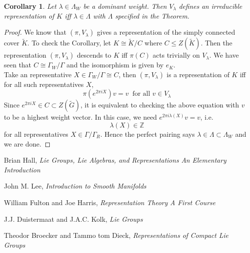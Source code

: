 \documentclass[11pt]{book}
\newtheorem{corollary}[theorem]{Corollary}
\newcommand{\bb}[1]{\mathbb{#1}}
\begin{document}
\begin{corollary}
Let $\lambda \in \Lambda_W$ be a dominant weight. Then $V_{\lambda}$ defines an irreducible representation of $K$ iff $\lambda \in \Lambda$ with $\Lambda$ specified in the Theorem.
\end{corollary}
\begin{proof}
We know that $(\pi,V_{\lambda})$ gives a representation of the simply connected cover $\tilde{K}$. To check the Corollary, let $K \cong \tilde{K}/C$ where $C \leq Z(\tilde{K})$. Then the representation $(\pi,V_{\lambda})$ descends to $K$ iff $\pi(C)$ acts trivially on $V_{\lambda}$. We have seen that $C \cong \Gamma_W/\Gamma$ and the isomorphism is given by $e_K$.\\
Take an representative $X \in \Gamma_W/\Gamma \cong C$, then $(\pi,V_{\lambda})$ is a representation of $K$ iff for all such representatives $X$,
$$\pi(e^{2\pi i X})v = v\ \text{ for all } v \in V_{\lambda}$$
Since $e^{2\pi i X} \in C \subset Z(\tilde{G})$, it is equivalent to checking the above equation with $v$ to be a highest weight vector. In this case, we need $e^{2\pi i \lambda(X)}v = v$, i.e.
$$ \lambda(X) \in \bb{Z}$$
for all representatives $X \in \Gamma/\Gamma_R$. Hence the perfect pairing says $\lambda \in \Lambda \subset \Lambda_W$ and we are done.
\end{proof}


\begin{thebibliography}{30}

Brian Hall,
\emph{Lie Groups, Lie Algebras, and Representations An Elementary Introduction}

John M. Lee,
\emph{Introduction to Smooth Manifolds}

William Fulton and Joe Harris,
\emph{Representation Theory A First Course}

J.J. Duistermaat and J.A.C. Kolk,
\emph{Lie Groups}

Theodor Broecker and Tammo tom Dieck,
\emph{Representations of Compact Lie Groups}


\end{thebibliography}
\end{document}
